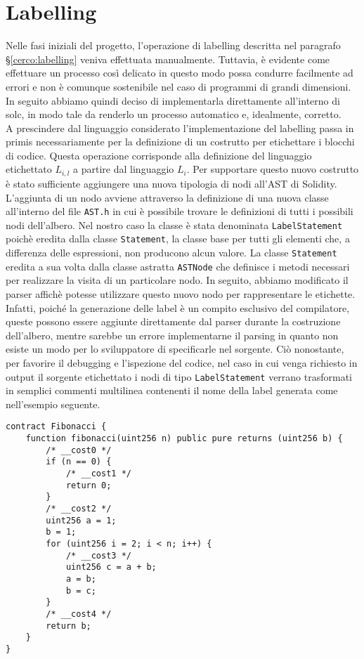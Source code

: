 \documentclass[12pt,a4paper,openright,oneside]{report}
\theoremstyle{definition}
\begin{document}
\section{Labelling}\label{impl:labelling}
Nelle fasi iniziali del progetto, l'operazione di labelling descritta nel paragrafo \S\ref{cerco:labelling} veniva effettuata manualmente. Tuttavia, \`{e} evidente come effettuare un processo cos\`{i} delicato in questo modo possa condurre facilmente ad errori e non \`{e} comunque sostenibile nel caso di programmi di grandi dimensioni. In seguito abbiamo quindi deciso di implementarla direttamente all'interno di solc, in modo tale da renderlo un processo automatico e, idealmente, corretto.\\
A prescindere dal linguaggio considerato l'implementazione del labelling passa in primis necessariamente per la definizione di un costrutto per etichettare i blocchi di codice. Questa operazione corrisponde alla definizione del linguaggio etichettato $L_{i,l}$ a partire dal linguaggio $L_i$. Per supportare questo nuovo costrutto \`{e} stato sufficiente aggiungere una nuova tipologia di nodi all'AST di Solidity. L'aggiunta di un nodo avviene attraverso la definizione di una nuova classe all'interno del file \texttt{AST.h} in cui \`{e} possibile trovare le definizioni di tutti i possibili nodi dell'albero. Nel nostro caso la classe \`{e} stata denominata \texttt{LabelStatement} poich\`{e} eredita dalla classe \texttt{Statement}, la classe base per tutti gli elementi che, a differenza delle espressioni, non producono alcun valore. La classe \texttt{Statement} eredita a sua volta dalla classe astratta \texttt{ASTNode} che definisce i metodi necessari per realizzare la visita di un particolare nodo. In seguito, abbiamo modificato il parser affich\`{e} potesse utilizzare questo nuovo nodo per rappresentare le etichette. Infatti, poich\'{e} la generazione delle label \`{e} un compito esclusivo del compilatore, queste possono essere aggiunte direttamente dal parser durante la costruzione dell'albero, mentre sarebbe un errore implementarne il parsing in quanto non esiste un modo per lo sviluppatore di specificarle nel sorgente. Ci\`{o} nonostante, per favorire il debugging e l'ispezione del codice, nel caso in cui venga richiesto in output il sorgente etichettato i nodi di tipo \texttt{LabelStatement} verrano trasformati in semplici commenti multilinea contenenti il nome della label generata come nell'esempio seguente.
\begin{lstlisting}[language=Solidity,caption=Esempio di codice etichettato,label={lst:labelled},frame=tlrb]
contract Fibonacci {
    function fibonacci(uint256 n) public pure returns (uint256 b) {
        /* __cost0 */
        if (n == 0) {
            /* __cost1 */
            return 0;
        }
        /* __cost2 */
        uint256 a = 1;
        b = 1;
        for (uint256 i = 2; i < n; i++) {
            /* __cost3 */
            uint256 c = a + b;
            a = b;
            b = c;
        }
        /* __cost4 */
        return b;
    }
}
\end{lstlisting}
\end{document}
